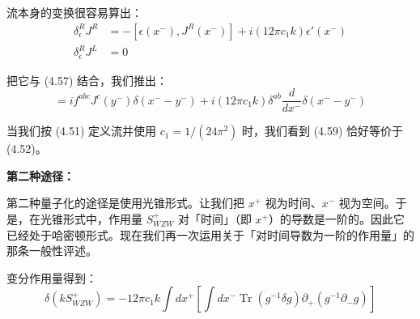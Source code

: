 流本身的变换很容易算出：
\begin{equation}
  \begin{aligned}
    \delta^R_\epsilon J^R &= -\left[\epsilon(x^-), J^R(x^-)\right] + i(12\pi c_1 k)\epsilon'(x^-)\\
    \delta^R_\epsilon J^L &= 0
  \end{aligned}
  \tag{4.58}
  \label{eq:4.58}
\end{equation}

把它与 (4.57) 结合，我们推出：
\begin{equation}
  [J^a(x^-), J^b(y^-)] = i f^{abc}J^c(y^-)\delta(x^--y^-) + i(12\pi c_1 k)\delta^{ab}\frac{d}{dx^-}\delta(x^--y^-)
  \tag{4.59}
  \label{eq:4.59}
\end{equation}

当我们按 (4.51) 定义流并使用 $c_1=1/(24\pi^2)$ 时，我们看到 (4.59) 恰好等价于 (4.52)。

\textbf{第二种途径：}

第二种量子化的途径是使用光锥形式。让我们把 $x^+$ 视为时间、$x^-$ 视为空间。于是，在光锥形式中，作用量 $S^+_{WZW}$ 对「时间」（即 $x^+$）的导数是一阶的。因此它已经处于哈密顿形式。现在我们再一次运用关于「对时间导数为一阶的作用量」的那条一般性评述。

变分作用量得到：
\begin{equation}
  \delta\left(kS^+_{WZW}\right) = -12\pi c_1 k\int dx^+\left[\int dx^-\operatorname{Tr}\left(g^{-1}\delta g\right)\partial_+\left(g^{-1}\partial_- g\right)\right]
  \tag{4.60}
  \label{eq:4.60}
\end{equation}

